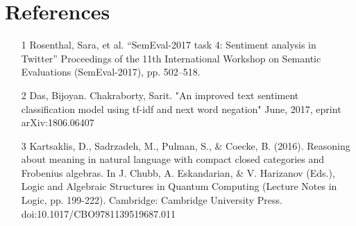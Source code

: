 \documentclass{amsart}
\theoremstyle{definition}
\theoremstyle{remark}
\numberwithin{equation}{section}
\begin{document}
\section{References}
\begin{itemize}
	\item [1] Rosenthal, Sara, et al. “SemEval-2017 task 4: Sentiment analysis in Twitter” Proceedings of the 11th International Workshop on Semantic Evaluations (SemEval-2017), pp. 502–518.
	\item [2] Das, Bijoyan. Chakraborty, Sarit. "An improved text sentiment classification model using tf-idf and next word negation" June, 2017, eprint arXiv:1806.06407
	\item [3] Kartsaklis, D., Sadrzadeh, M., Pulman, S., \& Coecke, B. (2016). Reasoning about meaning in natural language with compact closed categories and Frobenius algebras. In J. Chubb, A. Eskandarian, \& V. Harizanov (Eds.), Logic and Algebraic Structures in Quantum Computing (Lecture Notes in Logic, pp. 199-222). Cambridge: Cambridge University Press. doi:10.1017/CBO9781139519687.011
\end{itemize}
\end{document}
